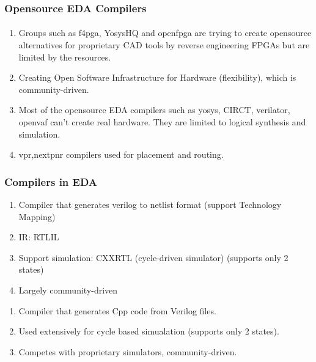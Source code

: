 \documentclass{beamer}
\begin{document}
{\begin{frame}[fragile]
  \frametitle{Opensource EDA Compilers}
  \framesubtitle{}
  \begin{enumerate}
    \item Groups such as f4pga, YosysHQ and openfpga are trying to create opensource
      alternatives for proprietary CAD tools by reverse engineering FPGAs
      but are limited by the resources.
    \item Creating Open Software Infrastructure for Hardware (flexibility),
      which is community-driven.
    \item Most of the opensource EDA compilers such as yosys, CIRCT, verilator,
      openvaf can't create real hardware. They are limited to
      logical synthesis and simulation.
     \item vpr\cite{vpr2},nextpnr\cite{nextpnr1} compilers used for placement and routing.
  \end{enumerate}
\end{frame}


\begin{frame}[fragile]
    \frametitle{Compilers in EDA}
        \begin{enumerate}
            \item Compiler that generates  verilog to netlist format (support Technology Mapping)
            \item IR: RTLIL
            \item Support simulation: CXXRTL (cycle-driven simulator) (supports
              only 2 states)
            \item Largely community-driven
        \end{enumerate}
        \begin{enumerate}
            \item Compiler that generates Cpp code from Verilog files.
            \item Used extensively for cycle based simualation (supports only 2 states).
            \item Competes with proprietary simulators, community-driven.
        \end{enumerate}
    
\end{frame}


}
\end{document}
